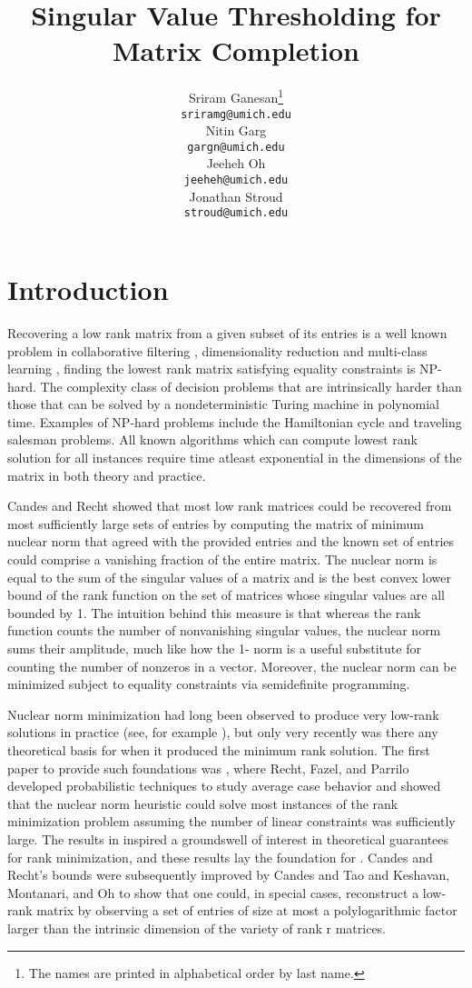 \documentclass{article} %
\title{Singular Value Thresholding for Matrix Completion}
\author{
Sriram Ganesan\thanks{ The names are printed in alphabetical order by last name.} \\
\texttt{sriramg@umich.edu} \\
\And
Nitin Garg \\
\texttt{gargn@umich.edu} \\
\AND
Jeeheh Oh \\
\texttt{jeeheh@umich.edu} \\
\And
Jonathan Stroud \\
\texttt{stroud@umich.edu} \\
}
\begin{document}
\maketitle

\begin{abstract}

\end{abstract}

\section{Introduction}

Recovering a low rank matrix from a given subset of its entries is a well known problem in collaborative filtering \cite{r25} , dimensionality reduction\cite{r20, r28} and multi-class learning \cite{r2, r22}, finding the lowest rank matrix satisfying equality constraints is NP-hard. The complexity class of decision problems that are intrinsically harder than those that can be solved by a nondeterministic Turing machine in polynomial time. Examples of NP-hard problems include the Hamiltonian cycle and traveling salesman problems. All known algorithms which can compute lowest rank solution for all instances require time atleast exponential in the dimensions of the matrix in both theory and practice.

Candes and Recht showed that most low rank matrices could be recovered from most sufficiently large sets of entries by computing the matrix of minimum nuclear norm that agreed with the provided entries\cite{r4} and the known set of entries could comprise a vanishing fraction of the entire matrix. The nuclear norm is equal to the sum of the singular values of a matrix and is the best convex lower bound of the rank function on the set of matrices whose singular values are all bounded by 1. The intuition behind this measure is that whereas the rank function counts the number of nonvanishing singular values, the nuclear norm sums their amplitude, much like how the 1- norm is a useful substitute for counting the number of nonzeros in a vector. Moreover, the nuclear norm can be minimized subject to equality constraints via semidefinite programming.

Nuclear norm minimization had long been observed to produce very low-rank solutions in practice (see, for example \cite{r11, r12, r26}), but only very recently was there any theoretical basis for when it produced the minimum rank solution. The first paper to provide such foundations was \cite{r24}, where Recht, Fazel, and Parrilo developed probabilistic techniques to study average case behavior and showed that the nuclear norm heuristic could solve most instances of the rank minimization problem assuming the number of linear constraints was sufficiently large. The results in \cite{r24} inspired a groundswell of interest in theoretical guarantees for rank minimization, and these results lay the foundation for \cite{r4}. Candes and Recht’s bounds were subsequently improved by Candes and Tao \cite{r7} and Keshavan, Montanari, and Oh \cite{keshavan2010matrix} to show that one could, in special cases, reconstruct a low-rank matrix by observing a set of entries of size at most a polylogarithmic factor larger than the intrinsic dimension of the variety of rank r matrices.
\end{document}
